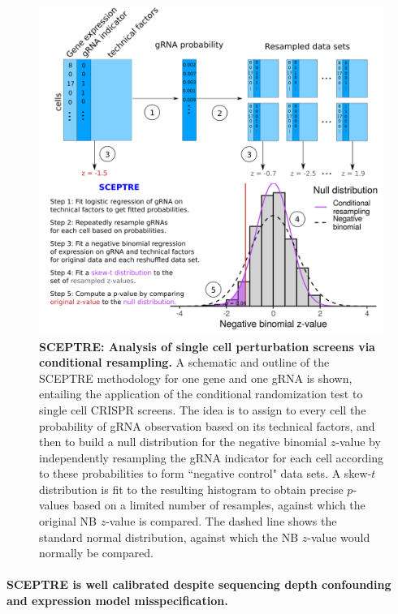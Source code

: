 \documentclass{nature}
\begin{document}
\clearpage
\thispagestyle{empty} 
\addtocounter{page}{-1}
\begin{figure}[h!]
	\includegraphics[width = \textwidth]{figures/Figure2/Figure2.png}
	\caption{\textbf{SCEPTRE: Analysis of single cell perturbation screens via conditional resampling.} A schematic and outline of the SCEPTRE methodology for one gene and one gRNA is shown, entailing the application of the conditional randomization test\cite{CetL16} to single cell CRISPR screens. The idea is to assign to every cell the probability of gRNA observation based on its technical factors, and then to build a null distribution for the negative binomial $z$-value by independently resampling the gRNA indicator for each cell according to these probabilities to form ``negative control" data sets. A skew-$t$ distribution is fit to the resulting histogram to obtain precise $p$-values based on a limited number of resamples, against which the original NB $z$-value is compared. The dashed line shows the standard normal distribution, against which the NB $z$-value would normally be compared.}
	\label{fig:method}
\end{figure}
\clearpage



\paragraph{SCEPTRE is well calibrated despite sequencing depth confounding and expression model misspecification.} 
\end{document}
